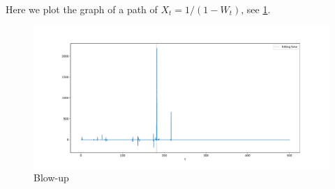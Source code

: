     \problem
    Here we plot the graph of a path of $X_t=1/(1-W_t)$, see \cref{fig:blowup}.
    \begin{figure}[h]
        \centering
        \includegraphics[width=\textwidth]{blowup}
        \caption{Blow-up}
        \label{fig:blowup}
    \end{figure}

